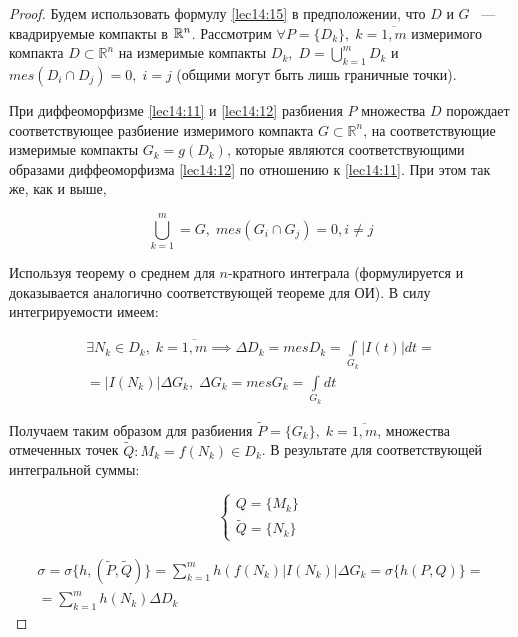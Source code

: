 \documentclass[../../main.tex]{subfiles}
\begin{document}
	
	\begin{proof}
		
	Будем использовать формулу \eqref{lec14:15} в предположении, что
	$D$ и $G$ ~--- квадрируемые компакты в $\mathbb{R}^n$. Рассмотрим $\forall P =
	\{ D_k \},\; k = \overline{1, m}$ измеримого компакта $D \subset 
	\mathbb{R}^n$ на измеримые компакты $D_k,\; D = \bigcup\limits_{k = 1}^{m} D_k$ 
	и $mes\left(D_i \cap D_j\right) = 0,\; i = j$ (общими могут быть лишь
	граничные точки).
		   
	При диффеоморфизме \eqref{lec14:11} и \eqref{lec14:12} разбиения $P$ 
	множества $D$ порождает соответствующее разбиение измеримого компакта 
	$G \subset \mathbb{R}^n$, на соответствующие измеримые компакты
	$G_k = g(D_k)$, которые являются соответствующими образами диффеоморфизма 
	\eqref{lec14:12} по отношению к \eqref{lec14:11}. При этом так же, как и выше,
	
	\[
	\bigcup\limits_{k = 1}^{m} = G,\; mes\left(G_i \cap G_j\right) = 0, i \neq j
	\]
	
	Используя теорему о среднем для $n$-кратного интеграла (формулируется и 
	доказывается аналогично соответствующей теореме для ОИ). 
	В силу интегрируемости имеем:
	
	\[
	\begin{array}{c}
	\exists N_k \in D_k,\; k = \overline{1, m} \implies \Delta D_k = mes D_k 
	= \int\limits_{G_k} |I\left( t \right)| dt = \\ = |I \left( N_k \right) |
	 \Delta G_k,\; \Delta G_k = mes G_k = \int\limits_{G_k} dt
	\end{array}
	\]
	
		
	Получаем таким образом для разбиения $\widetilde{P} = \{ G_k  \},\; 
	k = \overline{1, m}$, множества отмеченных точек $\widetilde{Q} : M_k = f(N_k) 
	\in D_k$. В результате для соответствующей интегральной суммы:
	
	\[
	\begin{cases}
	Q = \{ M_k \}\\
	\widetilde{Q} = \{ N_k \}
	\end{cases}
	\]
	
	\begin{equation}
	\label{lec15:40}
	\begin{gathered}
	\sigma = \sigma \{ h, (\widetilde{P}, \widetilde{Q}) \} = \sum_{k = 1}^{m} h 
	\left( f \left( N_k \right) \right|I\left( N_k \right)| \Delta G_k = 
	\sigma \{ h \left( P, Q \right) \} =\\= \sum_{k = 1}^{m} h 
	\left( N_k \right) \Delta D_k
	\end{gathered}
	\end{equation}
	

\end{proof}
\end{document}

